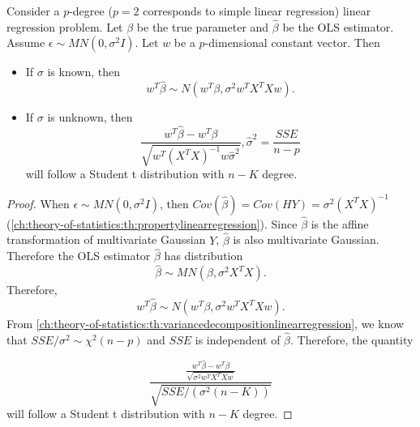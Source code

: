 \begin{refsection}
\begin{lemma}\label{ch:statistical-models:th:distributionOfCoefficientsLinearRegressionLemma}
Consider a $p$-degree ($p=2$ corresponds to simple linear regression) linear regression problem. Let $\beta$ be the true parameter and $\hat{\beta}$ be the OLS estimator. 		Assume $\epsilon \sim MN(0,\sigma^2 I)$. Let $w$ be a $p$-dimensional constant vector.
Then 
\begin{itemize}
	\item If $\sigma$ is known, then
	$$w^T\hat{\beta} \sim N(w^T\beta,\sigma^2 w^TX^TXw).$$
	\item If $\sigma$ is unknown, then
	$$\frac{w^T\hat{\beta} - w^T\beta}{\sqrt{w^T(X^TX)^{-1}w \hat{\sigma}^2}}, \hat{\sigma}^2 = \frac{SSE}{n-p}$$
	will follow a Student t distribution with $n-K$ degree.
\end{itemize}
\end{lemma}
\begin{proof}
When $\epsilon \sim MN(0,\sigma^2 I)$, then $Cov(\hat{\beta}) = Cov(HY) = \sigma^2 (X^TX)^{-1}$(\autoref{ch:theory-of-statistics:th:propertylinearregression}). Since $\hat{\beta}$ is the affine transformation of multivariate Gaussian $Y$, $\hat{\beta}$ is also multivariate Gaussian. Therefore the OLS estimator $\hat{\beta}$ has distribution
$$\hat{\beta} \sim MN(\beta,\sigma^2 X^TX).$$
Therefore,
$$w^T\hat{\beta} \sim N(w^T\beta,\sigma^2 w^TX^TXw).$$
From \autoref{ch:theory-of-statistics:th:variancedecompositionlinearregression}, we know that
$SSE/\sigma^2 \sim \chi^2(n-p)$ and $SSE$ is independent of $\hat{\beta}$. 
Therefore, the quantity

$$\frac{\frac{w^T\hat{\beta} - w^T\beta}{\sqrt{\sigma^2 w^TX^TXw}}}{\sqrt{SSE/(\sigma^2 (n-K))}}$$
will follow a Student t distribution with $n-K$ degree.

\end{proof}



\end{refsection}
